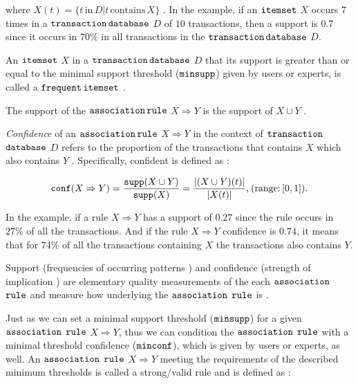 		where $X(t) = \{t\,\text{in}\,D|t\,\text{contains}\,X\}$ \cite{Zhang2002}\cite{Agrawal1993}. In the example, if an ${\operatorname{\mathtt{itemset}}}$ $X$ occurs $7$ times in a ${\operatorname{\mathtt{transaction}}}\,{\operatorname{\mathtt{database}}}$ $D$ of $10$ transactions, then a support is $0.7$ since it occurs in $70\%$ in all transactions in the ${\operatorname{\mathtt{transaction}}}\,{\operatorname{\mathtt{database}}}$ $D$.
		
		An ${\operatorname{\mathtt{itemset}}}$ $X$ in a ${\operatorname{\mathtt{transaction}}}\,{\operatorname{\mathtt{database}}}$ $D$ that its support is greater than or equal to the minimal support threshold (${\operatorname{\mathtt{minsupp}}}$) given by users or experts, is called a ${\operatorname{\mathtt{frequent}}}\,{\operatorname{\mathtt{itemset}}}$ \cite{Zhang2002}.
			
		The support of the ${\operatorname{\mathtt{association}}}\,{\operatorname{\mathtt{rule}}}$ $X \Rightarrow Y$ is the support of $X \cup Y$  \cite{Zhang2002}.
		
		\emph{Confidence} of an ${\operatorname{\mathtt{association}}}\,{\operatorname{\mathtt{rule}}}$ $X \Rightarrow Y$ in the context of ${\operatorname{\mathtt{transaction}}}$ ${\operatorname{\mathtt{database}}}$ $D$ refers to the proportion of the transactions that contains $X$ which also contains $Y$ \cite{Zhang2002}\cite{Malik2018}. Specifically, confident is defined as \cite{Zhang2002}:
		
				\begin{equation}
					\label{eqn:confidence}
					{\operatorname{\mathtt{conf}}}(X \Rightarrow Y) = \frac{{\operatorname{\mathtt{supp}}}(X \cup Y)}{{\operatorname{\mathtt{supp}}}(X)} = \frac{|(X \cup Y)(t)|}{|X(t)|}\text{,}\:(\text{range:}\,[0,1]) \text{.}
				\end{equation}
		
		In the example, if a rule $X \Rightarrow Y$ has a support of $0.27$ since the rule occurs in $27\%$ of all the transactions. And if the rule $X \Rightarrow Y$ confidence is $0.74$, it means that for $74\%$ of all the transactions containing $X$ the transactions also contains $Y$.
		
		Support (frequencies of occurring patterns \cite{Zhang2002}) and confidence (strength of implication \cite{Zhang2002}) are elementary quality measurements of the each ${\operatorname{\mathtt{association}}}$ ${\operatorname{\mathtt{rule}}}$ and measure how underlying the ${\operatorname{\mathtt{association}}}$ ${\operatorname{\mathtt{rule}}}$ is \cite{Agrawal1993}.
		
		\newpage
		Just as we can set a minimal support threshold (${\operatorname{\mathtt{minsupp}}}$) for a given ${\operatorname{\mathtt{association}}}$ ${\operatorname{\mathtt{rule}}}$ $X \Rightarrow Y$, thus we can condition the ${\operatorname{\mathtt{association}}}$ ${\operatorname{\mathtt{rule}}}$ with a minimal threshold confidence (${\operatorname{\mathtt{minconf}}}$), which is given by users or experts, as well. An ${\operatorname{\mathtt{association}}}$ ${\operatorname{\mathtt{rule}}}$ $X \Rightarrow Y$ meeting the requirements of the described minimum thresholds is called a strong/valid rule and is defined as \cite{Zhang2002}:
		
